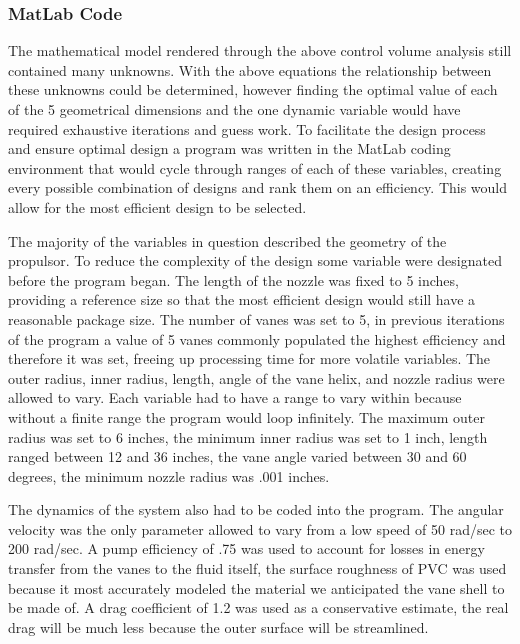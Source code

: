 \documentclass{report}
\begin{document}
\subsubsection{MatLab Code}
The mathematical model rendered through the above control volume analysis still contained many unknowns. With the above equations the relationship between these unknowns could be determined, however finding the optimal value of each of the 5 geometrical dimensions and the one dynamic variable would have required exhaustive iterations and guess work. To facilitate the design process and ensure optimal design a program was written in the MatLab coding environment that would cycle through ranges of each of these variables, creating every possible combination of designs and rank them on an efficiency. This would allow for the most efficient design to be selected.\par
The majority of the variables in question described the geometry of the propulsor. To reduce the complexity of the design some variable were designated before the program began. The length of the nozzle was fixed to 5 inches, providing a reference size so that the most efficient design would still have a reasonable package size. The number of vanes was set to 5, in previous iterations of the program a value of 5 vanes commonly populated the highest efficiency and therefore it was set, freeing up processing time for more volatile variables. The outer radius, inner radius, length, angle of the vane helix, and nozzle radius were allowed to vary. Each variable had to have a range to vary within because without a finite range the program would loop infinitely. The maximum outer radius was set to 6 inches, the minimum inner radius was set to 1 inch, length ranged between 12 and 36 inches, the vane angle varied between 30 and 60 degrees, the minimum nozzle radius was .001 inches.\par
The dynamics of the system also had to be coded into the program. The angular velocity was the only parameter allowed to vary from a low speed of 50 rad/sec to 200 rad/sec. A pump efficiency of .75 was used to account for losses in energy transfer from the vanes to the fluid itself, the surface roughness of PVC was used because it most accurately modeled the material we anticipated the vane shell to be made of. A drag coefficient of 1.2 was used as a conservative estimate, the real drag will be much less because the outer surface will be streamlined.\par
\end{document}
